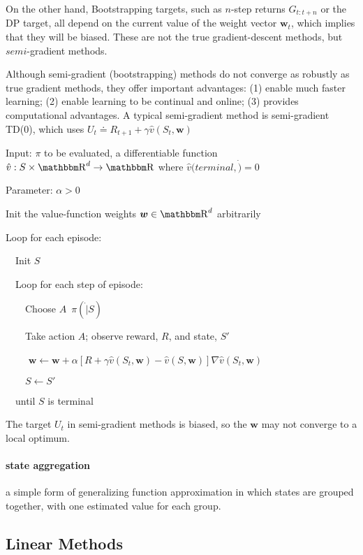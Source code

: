 \documentclass[sutton_barto_notes.tex]{subfiles}
\begin{document}
On the other hand, Bootstrapping targets, such as $n$-step returns $G_{t:t+n}$ or the DP target, all depend on the current value of the weight vector $\bm{w}_t$, which implies that they will be biased. These are not the true gradient-descent methods, but $semi$-gradient methods.

Although semi-gradient (bootstrapping) methods do not converge as robustly as true gradient methods, they offer important advantages: (1) enable much faster learning; (2) enable learning to be continual and online; (3) provides computational advantages. A typical semi-gradient method is semi-gradient TD(0), which uses $U_t \doteq R_{t+1} + \gamma \hat{v}(S_t, \bm{w})$

\begin{tcolorbox}[width=1.1\textwidth,title={Semi-gradient TD(0) for Estimating $\hat{v}\approx v_\pi$}]
Input: $\pi$ to be evaluated, a differentiable function $\hat{v}:S\times\R^d \rightarrow \R$ where $\hat{v}(terminal,\dot)=0$

Parameter: $\alpha > 0$

Init the value-function weights $\bm{w} \in \R^d$ arbitrarily

Loop for each episode:

$\quad$Init $S$

$\quad$Loop for each step of episode:

$\quad\quad$Choose $A$~$\pi(\dot | S)$

$\quad\quad$Take action $A$; observe reward, $R$, and state, $S'$

$\quad\quad$ $\bm{w} \leftarrow \bm{w} + \alpha [ R + \gamma \hat{v}(S_t, \bm{w}) - \hat{v}(S,\bm{w})]\nabla \hat{v}(S_t, \bm{w})$

$\quad\quad S \leftarrow S'$

$\quad$until $S$ is terminal
\end{tcolorbox}

The target $U_t$ in semi-gradient methods is biased, so the $\bm{w}$ may not converge to a local optimum.



\paragraph{state aggregation} a simple form of generalizing function approximation in which states are grouped together, with one estimated value for each group.



\subsection{Linear Methods}
\end{document}

